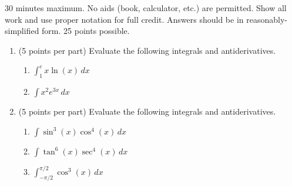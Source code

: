 \documentclass[12pt]{article}
\newcommand{\ds}{\displaystyle}
\begin{document}
30 minutes maximum.  No aids (book, calculator, etc.) are permitted.
Show all work and use proper notation for full credit.  Answers should
be in reasonably-simplified form.  25 points possible.

\begin{enumerate}
\item (5 points per part) Evaluate the following integrals and
  antiderivatives.
  \begin{enumerate}
  \item $\ds \int_1^e x \ln(x) \, dx$
    \vfill
    
  \item $\ds \int x^2 e^{3x} \, dx$
    \vfill
  \end{enumerate}

  \newpage
  
\item (5 points per part) Evaluate the following integrals and
  antiderivatives.
  \begin{enumerate}
  \item $\ds \int \sin^3(x) \cos^4(x) \, dx$
    \vfill
    
  \item $\ds \int \tan^6(x) \sec^4(x) \, dx$
    \vfill
    
  \item $\ds \int_{-\pi / 2}^{\pi / 2} \cos^3(x) \, dx$
    \vfill
  \end{enumerate}
\end{enumerate}
\end{document}
